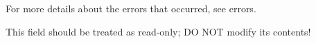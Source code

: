 For more details about the errors that occurred, see {\ttfamily errors}.

This field should be treated as read-\/only; D\-O N\-O\-T modify its contents! 
